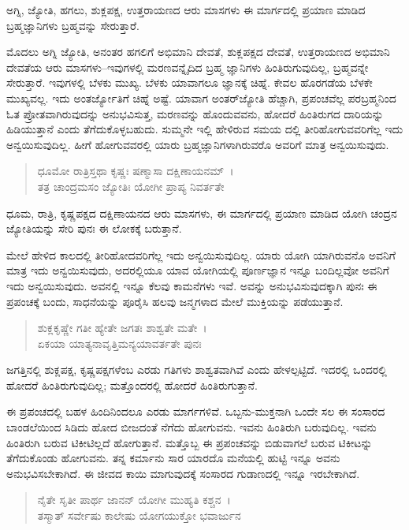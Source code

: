 {\small ಅಗ್ನಿ, ಜ್ಯೋತಿ, ಹಗಲು, ಶುಕ್ಲಪಕ್ಷ, ಉತ್ತರಾಯಣದ ಆರು ಮಾಸಗಳು ಈ ಮಾರ್ಗದಲ್ಲಿ ಪ್ರಯಾಣ ಮಾಡಿದ ಬ್ರಹ್ಮಜ್ಞಾನಿಗಳು ಬ್ರಹ್ಮವನ್ನು ಸೇರುತ್ತಾರೆ.}

ಮೊದಲು ಅಗ್ನಿ ಜ್ಯೋತಿ, ಅನಂತರ ಹಗಲಿಗೆ ಅಭಿಮಾನಿ ದೇವತೆ, ಶುಕ್ಲಪಕ್ಷದ ದೇವತೆ, ಉತ್ತರಾಯಣದ ಅಭಿಮಾನಿ ದೇವತೆಯ ಆರು ಮಾಸಗಳು–ಇವುಗಳಲ್ಲಿ ಮರಣವನ್ನೈದಿದ ಬ್ರಹ್ಮ ಜ್ಞಾನಿಗಳು ಹಿಂತಿರುಗುವುದಿಲ್ಲ, ಬ್ರಹ್ಮವನ್ನೇ ಸೇರುತ್ತಾರೆ. ಇವುಗಳಲ್ಲಿ ಬೆಳಕು ಮುಖ್ಯ. ಬೆಳಕು ಯಾವಾಗಲೂ ಜ್ಞಾನಕ್ಕೆ ಚಿಹ್ನೆ. ಕೇವಲ ಹೊರಗಡೆಯ ಬೆಳಕೇ ಮುಖ್ಯವಲ್ಲ. ಇದು ಅಂತರ್ಜ್ಯೋತಿಗೆ ಚಿಹ್ನೆ ಅಷ್ಟೆ. ಯಾವಾಗ ಅಂತರ್​ಜ್ಯೋತಿ ಹೆಚ್ಚಾಗಿ, ಪ್ರಪಂಚವೆಲ್ಲ ಪರಬ್ರಹ್ಮನಿಂದ ಓತ ಪ್ರೋತವಾಗಿರುವುದನ್ನು ಅನುಭವಿಸುತ್ತ, ಮರಣವನ್ನು ಹೊಂದುವವನು, ಹೋದರೆ ಹಿಂತಿರುಗದ ದಾರಿಯನ್ನು ಹಿಡಿಯುತ್ತಾನೆ ಎಂದು ತೆಗೆದುಕೊಳ್ಳಬಹುದು. ಸುಮ್ಮನೇ ಇಲ್ಲಿ ಹೇಳಿರುವ ಸಮಯ ದಲ್ಲಿ ತೀರಿಹೋಗುವವರಿಗೆಲ್ಲ ಇದು ಅನ್ವಯಿಸುವುದಿಲ್ಲ. ಹೀಗೆ ಹೋಗುವವರಲ್ಲಿ ಯಾರು ಬ್ರಹ್ಮಜ್ಞಾನಿಗಳಾಗಿರುವರೊ ಅವರಿಗೆ ಮಾತ್ರ ಅನ್ವಯಿಸುವುದು.

\begin{verse}
ಧೂಮೋ ರಾತ್ರಿಸ್ತಥಾ ಕೃಷ್ಣಃ ಷಣ್ಮಾಸಾ ದಕ್ಷಿಣಾಯನಮ್~।\\ತತ್ರ ಚಾಂದ್ರಮಸಂ ಜ್ಯೋತಿಃ ಯೋಗೀ ಪ್ರಾಪ್ಯ ನಿವರ್ತತೇ 
\end{verse}

{\small ಧೂಮ, ರಾತ್ರಿ, ಕೃಷ್ಣಪಕ್ಷದ ದಕ್ಷಿಣಾಯನದ ಆರು ಮಾಸಗಳು, ಈ ಮಾರ್ಗದಲ್ಲಿ ಪ್ರಯಾಣ ಮಾಡಿದ ಯೋಗಿ ಚಂದ್ರನ ಜ್ಯೋತಿಯನ್ನು ಸೇರಿ ಪುನಃ ಈ ಲೋಕಕ್ಕೆ ಬರುತ್ತಾನೆ.}

ಮೇಲೆ ಹೇಳಿದ ಕಾಲದಲ್ಲಿ ತೀರಿಹೋದವರಿಗೆಲ್ಲ ಇದು ಅನ್ವಯಿಸುವುದಿಲ್ಲ. ಯಾರು ಯೋಗಿ ಯಾಗಿರುವನೊ ಅವನಿಗೆ ಮಾತ್ರ ಇದು ಅನ್ವಯಿಸುವುದು, ಅದರಲ್ಲಿಯೂ ಯಾವ ಯೋಗಿಯಲ್ಲಿ ಪೂರ್ಣಜ್ಞಾನ ಇನ್ನೂ ಬಂದಿಲ್ಲವೋ ಅವನಿಗೆ ಇದು ಅನ್ವಯಿಸುವುದು. ಅವನಲ್ಲಿ ಇನ್ನೂ ಕೆಲವು ಕಾಮನೆಗಳು ಇವೆ. ಅವನ್ನು ಅನುಭವಿಸುವುದಕ್ಕಾಗಿ ಪುನಃ ಈ ಪ್ರಪಂಚಕ್ಕೆ ಬಂದು, ಸಾಧನೆಯನ್ನು ಪೂರೈಸಿ ಹಲವು ಜನ್ಮಗಳಾದ ಮೇಲೆ ಮುಕ್ತಿಯನ್ನು ಪಡೆಯುತ್ತಾನೆ.

\begin{verse}
ಶುಕ್ಲಕೃಷ್ಣೇ ಗತೀ ಹ್ಯೇತೇ ಜಗತಃ ಶಾಶ್ವತೇ ಮತೇ~।\\ಏಕಯಾ ಯಾತ್ಯನಾವೃತ್ತಿಮನ್ಯಯಾವರ್ತತೇ ಪುನಃ 
\end{verse}

{\small ಜಗತ್ತಿನಲ್ಲಿ ಶುಕ್ಲಪಕ್ಷ, ಕೃಷ್ಣಪಕ್ಷಗಳೆಂಬ ಎರಡು ಗತಿಗಳು ಶಾಶ್ವತವಾಗಿವೆ ಎಂದು ಹೇಳಲ್ಪಟ್ಟಿದೆ. ಇದರಲ್ಲಿ ಒಂದರಲ್ಲಿ ಹೋದರೆ ಹಿಂತಿರುಗುವುದಿಲ್ಲ; ಮತ್ತೊಂದರಲ್ಲಿ ಹೋದರೆ ಹಿಂತಿರುಗುತ್ತಾನೆ.}

ಈ ಪ್ರಪಂಚದಲ್ಲಿ ಬಹಳ ಹಿಂದಿನಿಂದಲೂ ಎರಡು ಮಾರ್ಗಗಳಿವೆ. ಒಬ್ಬನು-ಮುಕ್ತನಾಗಿ ಒಂದೇ ಸಲ ಈ ಸಂಸಾರದ ಬಾಂಡಲೆಯಿಂದ ಸಿಡಿದು ಹೋದ ಬೀಜದಂತೆ ನೆಗೆದು ಹೋಗುವನು. ಇವನು ಹಿಂತಿರುಗಿ ಬರುವುದಿಲ್ಲ. ಇವನು ಹಿಂತಿರುಗಿ ಬರುವ ಟಿಕೀಟಿಲ್ಲದೆ ಹೋಗುತ್ತಾನೆ. ಮತ್ತೊಬ್ಬ ಈ ಪ್ರಪಂಚವನ್ನು ಬಿಡುವಾಗಲೆ ಬರುವ ಟಿಕೀಟನ್ನು ತೆಗೆದುಕೊಂಡು ಹೋಗುವನು. ತನ್ನ ಕರ್ಮಾನು ಸಾರ ಯಾರದೊ ಮನೆಯಲ್ಲಿ ಹುಟ್ಟಿ ಇನ್ನೂ ಅವನು ಅನುಭವಿಸಬೇಕಾಗಿದೆ. ಈ ಜೀವದ ಕಾಯಿ ಮಾಗುವುದಕ್ಕೆ ಸಂಸಾರದ ಗುಡಾಣದಲ್ಲಿ ಇನ್ನೂ ಇರಬೇಕಾಗಿದೆ.

\begin{verse}
ನೈತೇ ಸೃತೀ ಪಾರ್ಥ ಜಾನನ್ ಯೋಗೀ ಮುಹ್ಯತಿ ಕಶ್ಚನ~।\\ತಸ್ಮಾತ್ ಸರ್ವೇಷು ಕಾಲೇಷು ಯೋಗಯುಕ್ತೋ ಭವಾರ್ಜುನ 
\end{verse}

